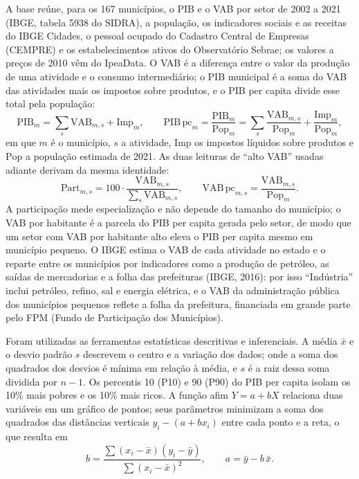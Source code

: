\documentclass[12pt,a4paper]{article}
\begin{document}
A base reúne, para os 167 municípios, o PIB e o VAB por setor de 2002 a 2021 (IBGE, tabela 5938 do SIDRA), a população, os indicadores sociais e as receitas do IBGE Cidades, o pessoal ocupado do Cadastro Central de Empresas (CEMPRE) e os estabelecimentos ativos do Observatório Sebrae; os valores a preços de 2010 vêm do IpeaData. O VAB é a diferença entre o valor da produção de uma atividade e o consumo intermediário; o PIB municipal é a soma do VAB das atividades mais os impostos sobre produtos, e o PIB per capita divide esse total pela população:
\begin{equation}
\mathrm{PIB}_m = \sum_{s} \mathrm{VAB}_{m,s} + \mathrm{Imp}_m, \qquad
\mathrm{PIB\,pc}_m = \frac{\mathrm{PIB}_m}{\mathrm{Pop}_m} = \sum_{s} \frac{\mathrm{VAB}_{m,s}}{\mathrm{Pop}_m} + \frac{\mathrm{Imp}_m}{\mathrm{Pop}_m},
\end{equation}
em que $m$ é o município, $s$ a atividade, $\mathrm{Imp}$ os impostos líquidos sobre produtos e $\mathrm{Pop}$ a população estimada de 2021. As duas leituras de ``alto VAB'' usadas adiante derivam da mesma identidade:
\begin{equation}
\mathrm{Part}_{m,s} = 100 \cdot \frac{\mathrm{VAB}_{m,s}}{\sum_{s} \mathrm{VAB}_{m,s}}, \qquad
\mathrm{VAB\,pc}_{m,s} = \frac{\mathrm{VAB}_{m,s}}{\mathrm{Pop}_m}.
\end{equation}
A participação mede especialização e não depende do tamanho do município; o VAB por habitante é a parcela do PIB per capita gerada pelo setor, de modo que um setor com VAB por habitante alto eleva o PIB per capita mesmo em município pequeno. O IBGE estima o VAB de cada atividade no estado e o reparte entre os municípios por indicadores como a produção de petróleo, as saídas de mercadorias e a folha das prefeituras (IBGE, 2016): por isso ``Indústria'' inclui petróleo, refino, sal e energia elétrica, e o VAB da administração pública dos municípios pequenos reflete a folha da prefeitura, financiada em grande parte pelo FPM (Fundo de Participação dos Municípios).

Foram utilizadas as ferramentas estatísticas descritivas e inferenciais. A média $\bar{x}$ e o desvio padrão $s$ descrevem o centro e a variação dos dados; onde a soma dos quadrados dos desvios é mínima em relação à média, e $s$ é a raiz dessa soma dividida por $n-1$. Os percentis 10 (P10) e 90 (P90) do PIB per capita isolam os 10\% mais pobres e os 10\% mais ricos. A função afim $Y = a + bX$ relaciona duas variáveis em um gráfico de pontos; seus parâmetros minimizam a soma dos quadrados das distâncias verticais $y_i - (a + b x_i)$ entre cada ponto e a reta, o que resulta em
\begin{equation}
b = \frac{\sum (x_i - \bar{x})(y_i - \bar{y})}{\sum (x_i - \bar{x})^2}, \qquad a = \bar{y} - b\,\bar{x}.
\end{equation}
\end{document}
